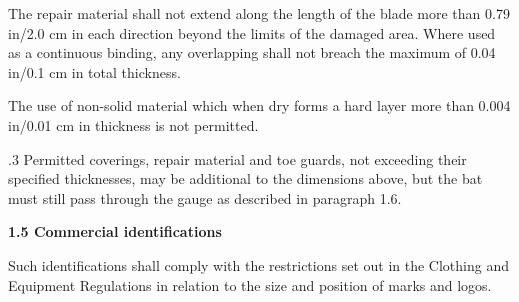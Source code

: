 \documentclass[12pt]{article}
\begin{document}
\vspace{\baselineskip}
\begin{adjustwidth}{0.5in}{0.07in}
{\fontsize{9pt}{10.8pt}\selectfont The repair material shall not extend along the length of the blade more than 0.79 in/2.0 cm in each direction beyond the limits of the damaged area. Where used as a continuous binding, any overlapping shall not breach the maximum of 0.04 in/0.1 cm in total thickness.\par}\par

\end{adjustwidth}


\vspace{\baselineskip}
\begin{adjustwidth}{0.5in}{0.08in}
{\fontsize{9pt}{10.8pt}\selectfont The use of non-solid material which when dry forms a hard layer more than 0.004 in/0.01 cm in thickness is not permitted.\par}\par

\end{adjustwidth}


\vspace{\baselineskip}
\begin{adjustwidth}{0.5in}{0.07in}
{\fontsize{9pt}{10.8pt}.3 \tabto{0.49in} Permitted coverings, repair material and toe guards, not exceeding their specified thicknesses, may be additional to the dimensions above, but the bat must still pass through the gauge as described in paragraph 1.6.\par}\par

\end{adjustwidth}


\vspace{\baselineskip}
{\fontsize{11pt}{13.2pt}\selectfont \textbf{1.5 \tabto{0.47in} Commercial identifications}\par}\par


\vspace{\baselineskip}
\begin{adjustwidth}{0.49in}{0.15in}
{\fontsize{9pt}{10.8pt}\selectfont Such identifications shall comply with the restrictions set out in the Clothing and Equipment Regulations in relation to the size and position of marks and logos.\par}\par

\end{adjustwidth}
\end{document}
